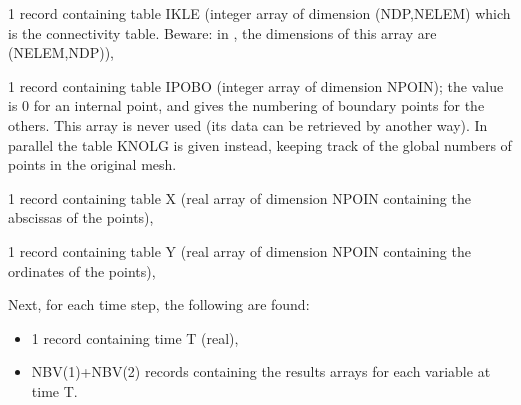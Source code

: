 1 record containing table IKLE (integer array of dimension (NDP,NELEM) which is
the connectivity table. Beware: in , the dimensions of this array
are (NELEM,NDP)),

1 record containing table IPOBO (integer array of dimension NPOIN); the value
is 0 for an internal point, and gives the numbering of boundary points for the
others. This array is never used (its data can be retrieved by another way). In
parallel the table KNOLG is given instead, keeping track of the global numbers
of points in the original mesh.

1 record containing table X (real array of dimension NPOIN containing the
abscissas of the points),

1 record containing table Y (real array of dimension NPOIN containing the
ordinates of the points),

Next, for each time step, the following are found:
\begin{itemize}
  \item 1 record containing time T (real),
  \item NBV(1)+NBV(2) records containing the results arrays for each variable
    at time T.
\end{itemize}

